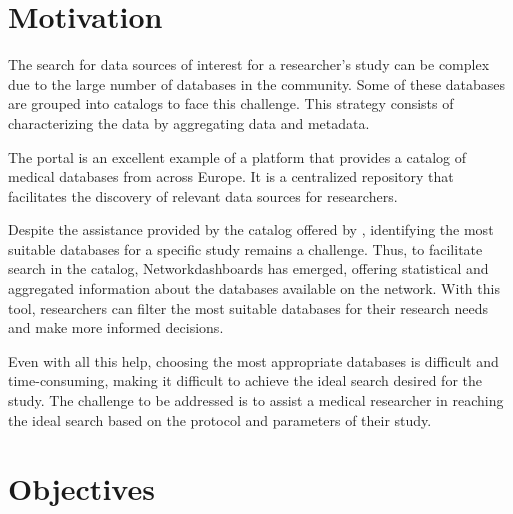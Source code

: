 \section{Motivation}

The search for data sources of interest for a researcher's study can be complex due to the large number of databases in the community. Some of these databases are grouped into catalogs to face this challenge. This strategy consists of characterizing the data by aggregating data and metadata.

The {\ehden} portal is an excellent example of a platform that provides a catalog of medical databases from across Europe. It is a centralized repository that facilitates the discovery of relevant data sources for researchers.

Despite the assistance provided by the catalog offered by {\ehden}, identifying the most suitable databases for a specific study remains a challenge. Thus, to facilitate search in the catalog, Networkdashboards has emerged, offering statistical and aggregated information about the databases available on the {\ehden} network. With this tool, researchers can filter the most suitable databases for their research needs and make more informed decisions.

Even with all this help, choosing the most appropriate databases is difficult and time-consuming, making it difficult to achieve the ideal search desired for the study. The challenge to be addressed is to assist a medical researcher in reaching the ideal search based on the protocol and parameters of their study.


\section{Objectives}



